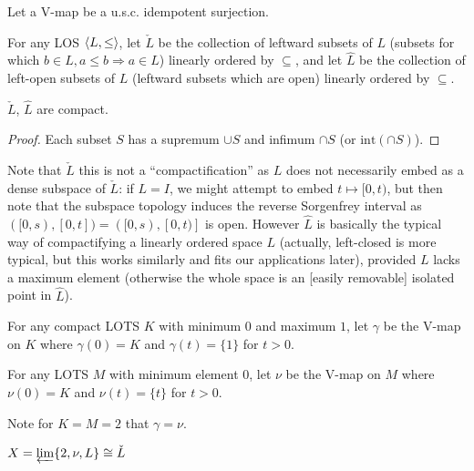\documentclass[11pt]{article}
\renewcommand{\int}{\textrm{int}}
\begin{document}
  \begin{definition}
    Let a V-map be a u.s.c. idempotent surjection.
  \end{definition}

  \begin{definition}
    For any LOS \(\langle L,\leq\rangle\), let \(\check L\) be the collection of
    leftward subsets of \(L\)
    (subsets for which \(b\in L,a\leq b\Rightarrow a\in L\))
    linearly ordered by \(\subseteq\), and let \(\hat L\) be the collection
    of left-open subsets of \(L\) (leftward subsets which are open)
    linearly ordered by \(\subseteq\).
  \end{definition}

  \begin{proposition}
    \(\check L\), \(\hat L\) are compact.
  \end{proposition}

  \begin{proof}
    Each subset \(S\) has a supremum \(\cup S\) and infimum \(\cap S\)
    (or \(\int(\cap S)\)).
  \end{proof}

  Note that \(\check L\)
  this is not a ``compactification'' as \(L\) does not necessarily
  embed as a dense subspace of \(\check L\): if \(L=I\), we might attempt to embed
  \(t\mapsto [0,t)\), but then note that the subspace topology induces the
  reverse Sorgenfrey interval as \(([0,s),[0,t])=([0,s),[0,t)]\) is open.
  However \(\hat L\) is basically
  the typical way of compactifying a linearly ordered space \(L\) (actually,
  left-closed is more typical, but this works similarly and fits our applications
  later),
  provided \(L\) lacks a maximum element (otherwise the whole space is an [easily
  removable] isolated point in \(\hat L\)).

  \begin{definition}
    For any compact LOTS \(K\) with minimum \(0\) and maximum \(1\),
    let \(\gamma\) be the V-map on \(K\) where \(\gamma(0)=K\) and \(\gamma(t)=\{1\}\)
    for \(t>0\).
  \end{definition}

  \begin{definition}
    For any LOTS \(M\) with minimum element \(0\),
    let \(\nu\) be the V-map on \(M\) where \(\nu(0)=K\) and \(\nu(t)=\{t\}\)
    for \(t>0\).
  \end{definition}

  Note for \(K=M=2\) that \(\gamma=\nu\).

  \begin{theorem}
    \(X=\varprojlim \{2, \nu, L\}\cong \check L\)
  \end{theorem}
\end{document}
